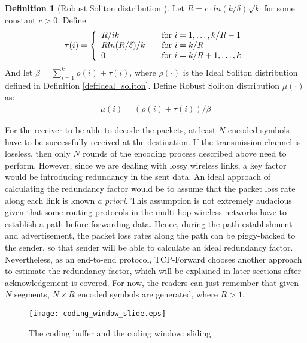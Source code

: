 \documentclass[10pt, conference, final, letterpaper]{IEEEtran}
\theoremstyle{definition}
\newtheorem{defn}{Definition}[section]
\begin{document}
\begin{defn}[Robust Soliton distribution \cite{ltcodes}]\label{def:robust_soliton}
	Let $R = c \cdot ln(k/\delta)\sqrt{k}$ for some constant $c > 0$. Define \\
	\begin{align}
		\tau(i) = \left\{
			\begin{array}{l l}
				R/ik & \quad \text{for $i = 1,\dots,k/R-1$} \\
				Rln(R/\delta)/k & \quad \text{for $i = k/R$} \\
				0 & \quad \text{for $i = k/R+1, \dots ,k$}
		\end{array} \right.
	\end{align}
	And let $\beta = \sum_{i = 1}^{k} \rho(i) + \tau(i)$, where $\rho(\cdot)$ is the Ideal Soliton distribution defined in Definition \ref{def:ideal_soliton}. Define Robust Soliton distribution $\mu(\cdot)$ as:
	\begin{align}
		\mu(i) = (\rho(i) + \tau(i))/\beta
	\end{align}
\end{defn}

For the receiver to be able to decode the packets, at least $N$ encoded symbols have to be successfully received at the destination. If the transmission channel is lossless, then only $N$ rounds of the encoding process described above need to perform. However, since we are dealing with lossy wireless links, a key factor would be introducing redundancy in the sent data. An ideal approach of calculating the redundancy factor would be to assume that the packet loss rate along each link is known \textit{a priori}. This assumption is not extremely audacious given that some routing protocols in the multi-hop wireless networks have to establish a path before forwarding data. Hence, during the path establishment and advertisement, the packet loss rates along the path can be piggy-backed to the sender, so that sender will be able to calculate an ideal redundancy factor. Nevertheless, as an end-to-end protocol, TCP-Forward chooses another approach to estimate the redundancy factor, which will be explained in later sections after acknowledgement is covered. For now, the readers can just remember that given $N$ segments, $N \times R$ encoded symbols are generated, where $R > 1$.

\begin{figure}[hbt]
	\begin{center}
		\texttt{[image: coding\_window\_slide.eps]}
	\end{center}
	\caption{The coding buffer and the coding window: sliding}
	\label{fig:coding_window_slide}
\end{figure}
\end{document}
